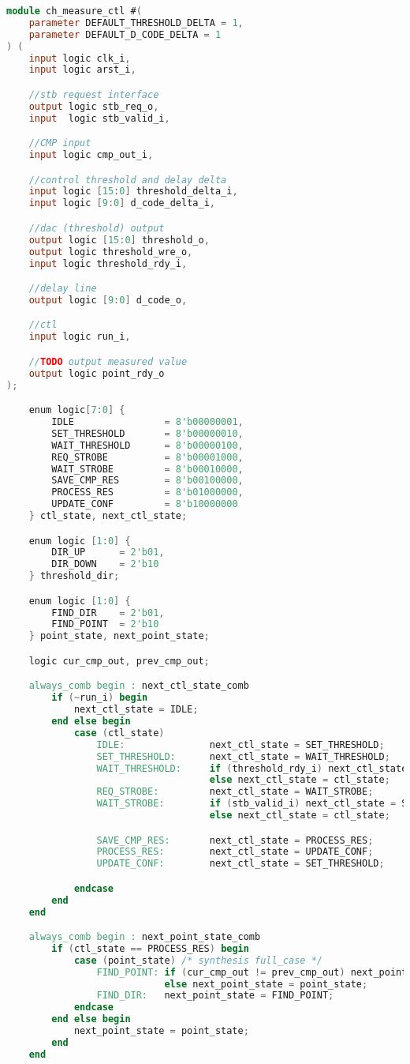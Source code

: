 \begin{lstlisting}[language=Verilog]
module ch_measure_ctl #(
	parameter DEFAULT_THRESHOLD_DELTA = 1,
	parameter DEFAULT_D_CODE_DELTA = 1    
) (
	input logic clk_i,
	input logic arst_i,

	//stb request interface
	output logic stb_req_o,
	input  logic stb_valid_i,

	//CMP input
	input logic cmp_out_i,

	//control threshold and delay delta
	input logic [15:0] threshold_delta_i,
	input logic [9:0] d_code_delta_i,

	//dac (threshold) output
	output logic [15:0] threshold_o,
	output logic threshold_wre_o,
	input logic threshold_rdy_i,

	//delay line
	output logic [9:0] d_code_o,

	//ctl
	input logic run_i,

	//TODO output measured value
	output logic point_rdy_o
);

	enum logic[7:0] { 
		IDLE 		        = 8'b00000001,
		SET_THRESHOLD 		= 8'b00000010,
		WAIT_THRESHOLD 		= 8'b00000100,
		REQ_STROBE 			= 8'b00001000,
		WAIT_STROBE			= 8'b00010000,
		SAVE_CMP_RES		= 8'b00100000,
		PROCESS_RES			= 8'b01000000,
		UPDATE_CONF			= 8'b10000000
	} ctl_state, next_ctl_state;

	enum logic [1:0] {
		DIR_UP		= 2'b01,
		DIR_DOWN	= 2'b10
	} threshold_dir;

	enum logic [1:0] {
		FIND_DIR	= 2'b01,
		FIND_POINT	= 2'b10
	} point_state, next_point_state;

	logic cur_cmp_out, prev_cmp_out;

	always_comb begin : next_ctl_state_comb
		if (~run_i) begin
			next_ctl_state = IDLE;
		end else begin
			case (ctl_state)
				IDLE:   			next_ctl_state = SET_THRESHOLD;
				SET_THRESHOLD:		next_ctl_state = WAIT_THRESHOLD;
				WAIT_THRESHOLD:		if (threshold_rdy_i) next_ctl_state = REQ_STROBE;
									else next_ctl_state = ctl_state;
				REQ_STROBE:			next_ctl_state = WAIT_STROBE;	
				WAIT_STROBE:		if (stb_valid_i) next_ctl_state = SAVE_CMP_RES;
									else next_ctl_state = ctl_state;

				SAVE_CMP_RES:		next_ctl_state = PROCESS_RES;
				PROCESS_RES:		next_ctl_state = UPDATE_CONF;
				UPDATE_CONF:		next_ctl_state = SET_THRESHOLD;

			endcase
		end
	end

	always_comb begin : next_point_state_comb
		if (ctl_state == PROCESS_RES) begin
			case (point_state) /* synthesis full_case */
				FIND_POINT: if (cur_cmp_out != prev_cmp_out) next_point_state = FIND_DIR;
							else next_point_state = point_state;
				FIND_DIR:	next_point_state = FIND_POINT;
			endcase
		end else begin
			next_point_state = point_state;
		end
	end


\end{lstlisting}
